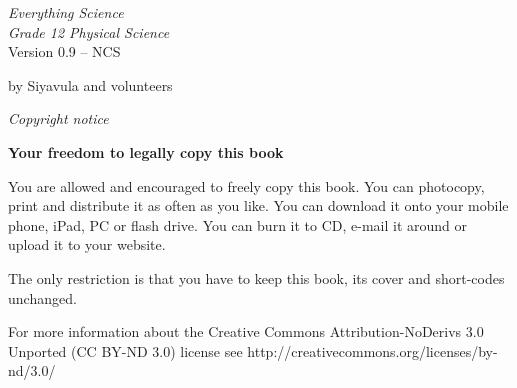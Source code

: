 \newpage
\begin{center}
    \thispagestyle{empty}

    \vspace*{4in}

    
    {\normalfont\sffamily\fontsize{36}\normalfont\itshape{Everything Science} \\ \vspace*{1cm}
     \normalfont\sffamily\fontsize{22}\normalfont\itshape{Grade 12 Physical Science}}
    \vspace*{1in} \\
    \LARGE Version 0.9 -- NCS \\

   {\vspace*{2in}
     by Siyavula and volunteers 
  

\vfill

    }
\end{center}






\newpage
\thispagestyle{empty}
\begin{center}
\normalfont\sffamily\fontsize{22}\normalfont\itshape Copyright notice\\

\vspace*{1in}

\textbf{Your freedom to legally copy this book}\\

\end{center}


{\LARGE
You are allowed and encouraged to freely copy this book. You can photocopy, print and distribute it as
often as you like. You can download it onto your mobile phone, iPad, PC or flash drive. You can burn it
to CD, e-mail it around or upload it to your website. \par

The only restriction is that you have to keep this book, its cover and short-codes unchanged.\par

For more information about the Creative Commons Attribution-NoDerivs 3.0 Unported (CC BY-ND
3.0) license see http://creativecommons.org/licenses/by-nd/3.0/}\\

\vspace*{4in}

